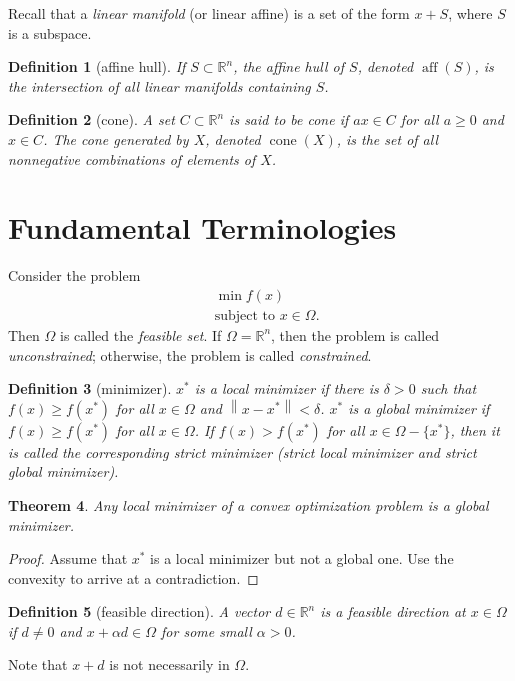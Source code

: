 \documentclass[12pt,a4paper]{report}
\numberwithin{equation}{section}
\theoremstyle{mystyle}
\newtheorem{definition}{Definition}[section]
\newtheorem{theorem}[definition]{Theorem}
\newcommand{\R}{\mathbb{R}}
\newcommand{\cone}{\operatorname{cone}}
\newcommand{\aff}{\operatorname{aff}}
\newcommand{\norm}[1]{\left\lVert #1 \right\rVert}
\begin{document}
	Recall that a \emph{linear manifold} (or linear affine) is a set of the form $x+S$, where $S$ is a subspace.
	\begin{definition}[affine hull]
		If $S\subset \R^n$, the \emph{affine hull} of $S$, denoted $\aff(S)$, is the intersection of all linear manifolds containing $S$. 
	\end{definition}
	
	\begin{definition}[cone]
		A set $C\subset \R^n$ is said to be \emph{cone} if $ax\in C$ for all $a\geq 0$ and $x\in C$. The \emph{cone generated by $X$}, denoted $\cone(X)$, is the set of all nonnegative combinations of elements of $X$.
	\end{definition}
	
	
	\section{Fundamental Terminologies}
	Consider the problem
	\begin{equation}
		\begin{split}
			&\ \min f(x)\\
			&\ \text{subject to } x\in \Omega.  
		\end{split}
	\end{equation}
	Then $\Omega$ is called the \emph{feasible set}. If $\Omega=\R^n$, then the problem is called \emph{unconstrained}; otherwise, the problem is called \emph{constrained}.
	
	\begin{definition}[minimizer]
		$x^*$ is a \emph{local minimizer} if there is $\delta >0$ such that $f(x)\geq f(x^*)$ for all $x\in \Omega$ and $\norm{x-x^*}<\delta$. $x^*$ is a \emph{global minimizer} if $f(x)\geq f(x^*)$ for all $x\in \Omega$. If $f(x)>f(x^*)$ for all $x\in \Omega-\{x^*\}$, then it is called the corresponding strict minimizer (strict local minimizer and strict global minimizer).
	\end{definition}

	\begin{theorem}
		Any local minimizer of a convex optimization problem is a global minimizer.
	\end{theorem}
	\begin{proof}
		Assume that $x^*$ is a local minimizer but not a global one. Use the convexity to arrive at a contradiction.
	\end{proof}
	
	
	\begin{definition}[feasible direction]
		A vector $d\in \R^n$ is a feasible direction at $x\in \Omega$ if $d\neq 0$ and $x+\alpha d\in \Omega$ for some small $\alpha>0$.
	\end{definition}
	Note that $x+d$ is not necessarily in $\Omega$.
	
\end{document}
